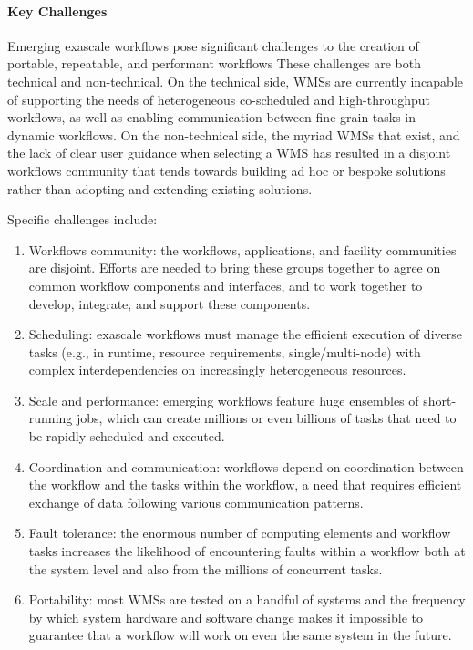 \paragraph{Key Challenges}
Emerging exascale workflows pose significant
challenges to the creation of portable, repeatable, and performant workflows
These
challenges are both technical and non-technical. On the technical side, WMSs
are currently incapable of supporting the needs of heterogeneous co-scheduled
and high-throughput workflows, as well as enabling communication between fine
grain tasks in dynamic workflows. On the non-technical side, the myriad WMSs
that exist, and the lack of clear user guidance when selecting a WMS has resulted
in a disjoint workflows community that tends towards building ad hoc or
bespoke solutions rather than adopting and extending existing solutions. 

Specific challenges include: 
\begin{enumerate}
    \item Workflows community: the workflows, applications, and facility communities are disjoint. Efforts are needed to bring these groups together to agree on common workflow components and interfaces, and to work together to develop, integrate, and support these components.
    \item Scheduling: exascale workflows must manage the efficient execution of diverse
    tasks (e.g., in runtime, resource requirements, single/multi-node) with complex interdependencies on increasingly heterogeneous resources. 
    \item Scale and performance: emerging workflows feature huge ensembles of short-running jobs, which can create millions or even billions of tasks that need to be rapidly scheduled and executed.
    \item Coordination and communication: workflows depend on coordination between the workflow and the tasks within the workflow, a need that requires efficient exchange of data following various communication patterns.
    \item Fault tolerance: the enormous number of computing elements and workflow tasks increases the likelihood of encountering faults within a workflow both at the system level and also from the millions of concurrent tasks. 
    \item Portability: most WMSs are tested on a handful of systems and the frequency by which system hardware and software change makes it impossible to guarantee that a workflow will work on even the same system in the future.
\end{enumerate}

